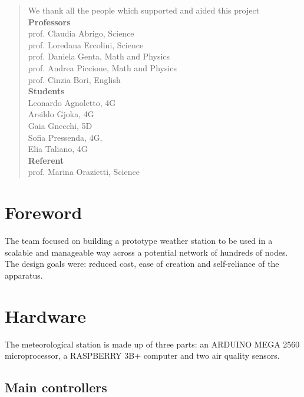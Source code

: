 \documentclass[12pt, a4paper]{article}
\begin{document}
	\clearpage
	\tableofcontents
	\clearpage
	\renewcommand{\abstractname}{Acknowledgements}
	\begin{center}
		\begin{abstract}
			\vspace{10mm}
			We thank all the people which supported and aided this project\\
			\vspace{10mm}
			\textbf{Professors}\\
			prof. Claudia Abrigo, Science\\
			prof. Loredana Ercolini, Science\\
			prof. Daniela Genta, Math and Physics\\
			prof. Andrea Piccione, Math and Physics\\
			prof. Cinzia Bori, English\\
			\vspace{10mm}
			\textbf{Students}\\
			Leonardo Agnoletto, 4G\\
			Arsildo Gjoka, 4G\\
			Gaia Gnecchi, 5D\\
			Sofia Pressenda, 4G,\\
			Elia Taliano, 4G\\
			\vspace{10mm}
			\textbf{Referent}\\
			prof. Marina Orazietti, Science\\
		\end{abstract}
	\end{center}

\clearpage
\section{Foreword}
The team focused on building a prototype weather station to be used in a scalable and manageable way across a potential network of hundreds of nodes.
The design goals were: reduced cost, ease of creation and  self-reliance of the apparatus.

\section{Hardware}
The meteorological station is made up of three parts: an ARDUINO MEGA 2560 microprocessor, a RASPBERRY 3B+ computer and two air quality sensors.
\subsection{Main controllers}
\end{document}
